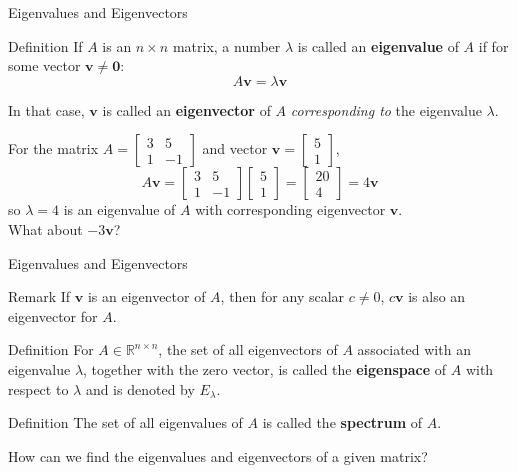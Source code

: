 \documentclass{beamer}
\newcommand{\vv}{\mathbf{v}}
\begin{document}
\begin{frame}{Eigenvalues and Eigenvectors}
\begin{block}{Definition}
    If $A$ is an $n \times n$ matrix, a number $\lambda$ is called an \textbf{eigenvalue} of $A$ if for some vector $\vv\ne\mathbf{0}$:
    \begin{equation*} A\vv = \lambda \vv\end{equation*}

In that case, $\vv$ is called an \textbf{eigenvector} of $A$ \textit{corresponding to} the eigenvalue $\lambda$.
\end{block}
\pause
\begin{example}
    For the matrix $A = \left[ \begin{array}{rr} 3 & 5 \\ 1 & -1 \end{array}\right]$ and vector $\vv = \left[ \begin{array}{r} 5 \\ 1 \end{array}\right]$,
    \[A\vv =  \left[ \begin{array}{rr} 3 & 5 \\ 1 & -1 \end{array}\right]\left[ \begin{array}{r} 5 \\ 1 \end{array}\right] = \left[ \begin{array}{r} 20 \\ 4 \end{array}\right] =4\vv\]
    so $\lambda = 4$ is an eigenvalue of $A$ with corresponding eigenvector $\vv$.\pause
    \\What about $-3\vv$?
\end{example}

\end{frame}



\begin{frame}{Eigenvalues and Eigenvectors}
\begin{block}{Remark}
    If $\vv$ is an eigenvector of $A$, then for any scalar $c\ne 0$, $c\vv$ is also an eigenvector for $A$.
\end{block}
\pause
\begin{block}{Definition}
    For \(A \in \mathbb{R}^{n \times n}\), the set of all eigenvectors of \(A\) associated with an eigenvalue \(\lambda\), together with the zero vector, is called the \textbf{eigenspace} of \(A\) with respect to \(\lambda\) and is denoted by \(E_{\lambda}\).

\end{block}
\pause
\begin{block}{Definition}
    The set of all eigenvalues of \(A\) is called the \textbf{spectrum} of \(A\).

\end{block}

\pause
How can we find the eigenvalues and eigenvectors of a given matrix?

\end{frame}
\end{document}
